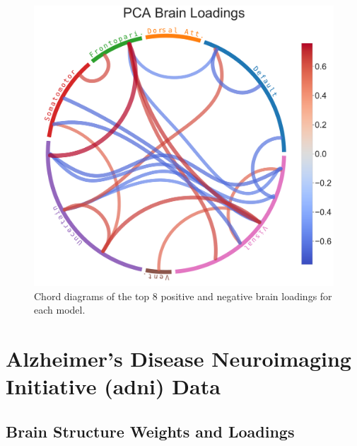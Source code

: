 \begin{figure}
    \includegraphics[width=0.49\linewidth]{figures/hcp/PCA brain loadings}
    \caption{Chord diagrams of the top 8 positive and negative brain \gls{loadings} for each model.}\label{fig:chord_loadings}
\end{figure}

\newpage


\section{Alzheimer's Disease Neuroimaging Initiative (\acrshort{adni}) Data}

\subsection{Brain Structure Weights and Loadings}

